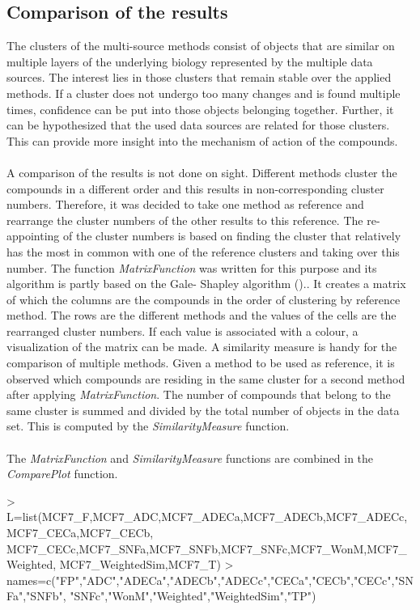 \documentclass[a4paper]{article}
\begin{document}
\subsection{Comparison of the results}
The clusters of the multi-source methods consist of objects that
are similar on multiple layers of the underlying biology represented by the
multiple data sources. The interest lies in those clusters that remain stable over
the applied methods. If a cluster does not undergo too many changes and is found
multiple times, confidence can be put into those objects belonging together.
Further, it can be hypothesized that the used data sources are related for those
clusters. This can provide more insight into the mechanism of action of the
compounds.\\ \\
A comparison of the results is not done on sight. Different methods cluster the
compounds in a different order and this results in non-corresponding cluster
numbers. Therefore, it was decided to take one method as reference and rearrange
the cluster numbers of the other results to this reference. The re-appointing of
the cluster numbers is based on finding the cluster that relatively has the most
in common with one of the reference clusters and taking over this number. The
function {\it MatrixFunction} was written for this purpose and its algorithm is
partly based on the Gale- Shapley algorithm (\cite{Kleinberg2005})..
It creates a matrix of which the columns are the compounds in the order of
clustering by reference method. The rows are the different methods and the
values of the cells are the rearranged cluster numbers. If each value is
associated with a colour, a visualization of the matrix can be made. A
similarity measure is handy for the comparison of multiple methods. Given a
method to be used as reference, it is observed which compounds are residing in
the same cluster for a second method after applying {\it MatrixFunction}. The
number of compounds that belong to the same cluster is summed and divided by the
total number of objects in the data set. This is computed by the {\it
SimilarityMeasure} function.\\ \\
The {\it MatrixFunction} and {\it SimilarityMeasure} functions are combined in
the {\it ComparePlot} function. 
\begin{Schunk}
\begin{Sinput}
> L=list(MCF7_F,MCF7_ADC,MCF7_ADECa,MCF7_ADECb,MCF7_ADECc,MCF7_CECa,MCF7_CECb,
        MCF7_CECc,MCF7_SNFa,MCF7_SNFb,MCF7_SNFc,MCF7_WonM,MCF7_Weighted,
        MCF7_WeightedSim,MCF7_T)
> names=c("FP","ADC","ADECa","ADECb","ADECc","CECa","CECb","CECc","SNFa","SNFb",
         "SNFc","WonM","Weighted","WeightedSim","TP")
\end{Sinput}
\end{Schunk}
\end{document}
